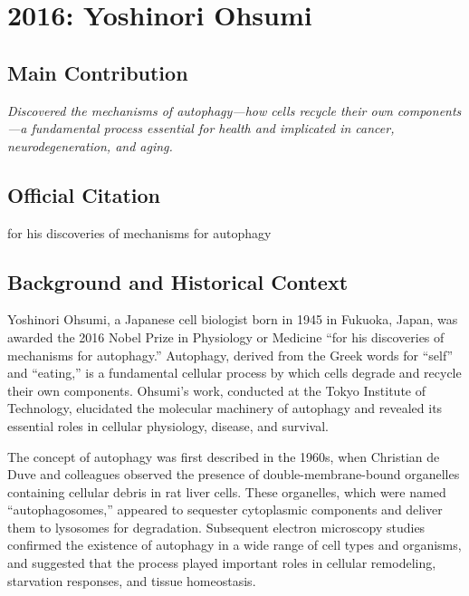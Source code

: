 \chapter[2016 --- Ohsumi]{2016: Yoshinori Ohsumi}
\label{ch:2016_yoshinoriohsumi}

\section*{Main Contribution}

\textit{Discovered the mechanisms of autophagy---how cells recycle their own components---a fundamental process essential for health and implicated in cancer, neurodegeneration, and aging.}\cite{nobel-2016,lecture-2016}

\section{Official Citation}

for his discoveries of mechanisms for autophagy

\section{Background and Historical Context}

Yoshinori Ohsumi, a Japanese cell biologist born in 1945 in Fukuoka, Japan, was awarded the 2016 Nobel Prize in Physiology or Medicine ``for his discoveries of mechanisms for autophagy.'' Autophagy, derived from the Greek words for ``self'' and ``eating,'' is a fundamental cellular process by which cells degrade and recycle their own components. Ohsumi's work, conducted at the Tokyo Institute of Technology, elucidated the molecular machinery of autophagy and revealed its essential roles in cellular physiology, disease, and survival.

The concept of autophagy was first described in the 1960s, when Christian de Duve and colleagues observed the presence of double-membrane-bound organelles containing cellular debris in rat liver cells. These organelles, which were named ``autophagosomes,'' appeared to sequester cytoplasmic components and deliver them to lysosomes for degradation. Subsequent electron microscopy studies confirmed the existence of autophagy in a wide range of cell types and organisms, and suggested that the process played important roles in cellular remodeling, starvation responses, and tissue homeostasis.

